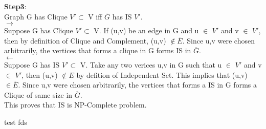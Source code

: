 \documentclass{article}%
\newcommand{\add}[1]{\textcolor{dkgreen}{#1}}
\begin{document}
\begin{flushleft}
\textbf{Step3}:\\
Graph G has Clique $V' \subset$ V iff $\overline{G}$ has IS $V'$.\\
$\rightarrow$\\
Suppose G has Clique $V' \subset$ V. If (u,v) be an edge in G and u $\in$ $V'$ and v $\in$ $V'$, then by definition of Clique and Complement, (u,v) $\notin \overline{E}$. Since u,v were chosen arbitrarily, the vertices that forms a clique in G forms IS in $\overline{G}$.\\
$\leftarrow$\\
Suppose G has IS $V' \subset$ V.  Take any two verices u,v in G such that u $\in$ $V'$ and v $\in$ $V'$, then (u,v) $\notin {E}$ by defition of Independent Set. This implies that (u,v)  $\in \overline{E}$.  Since u,v were chosen arbitrarily, the vertices that forms a IS in G forms a Clique of same size in $\overline{G}$.\\

This proves that IS is NP-Complete problem.

\add{test} \rm{fds}
\end{flushleft}
\end{document}
